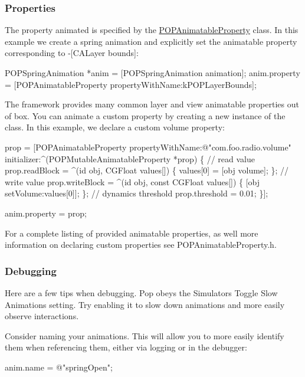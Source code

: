 \subsubsection*{Properties}

The property animated is specified by the {\ttfamily \mbox{\hyperlink{interface_p_o_p_animatable_property}{P\+O\+P\+Animatable\+Property}}} class. In this example we create a spring animation and explicitly set the animatable property corresponding to {\ttfamily -\/\mbox{[}C\+A\+Layer bounds\mbox{]}}\+:


\begin{DoxyCode}
POPSpringAnimation *anim = [POPSpringAnimation animation];
anim.property = [POPAnimatableProperty propertyWithName:kPOPLayerBounds];
\end{DoxyCode}


The framework provides many common layer and view animatable properties out of box. You can animate a custom property by creating a new instance of the class. In this example, we declare a custom volume property\+:


\begin{DoxyCode}
prop = [POPAnimatableProperty propertyWithName:@"com.foo.radio.volume"
       initializer:^(POPMutableAnimatableProperty *prop) \{
  // read value
  prop.readBlock = ^(id obj, CGFloat values[]) \{
    values[0] = [obj volume];
  \};
  // write value
  prop.writeBlock = ^(id obj, const CGFloat values[]) \{
    [obj setVolume:values[0]];
  \};
  // dynamics threshold
  prop.threshold = 0.01;
\}];

anim.property = prop;
\end{DoxyCode}


For a complete listing of provided animatable properties, as well more information on declaring custom properties see {\ttfamily P\+O\+P\+Animatable\+Property.\+h}.

\subsubsection*{Debugging}

Here are a few tips when debugging. Pop obeys the Simulator\textquotesingle{}s Toggle Slow Animations setting. Try enabling it to slow down animations and more easily observe interactions.

Consider naming your animations. This will allow you to more easily identify them when referencing them, either via logging or in the debugger\+:


\begin{DoxyCode}
anim.name = @"springOpen";
\end{DoxyCode}


